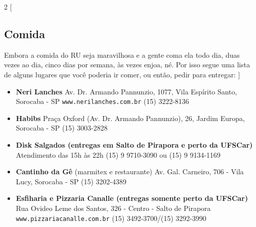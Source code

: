 \begin{multicols}{2}
  [
  \subsection{Comida}
  Embora a comida do RU seja maravilhosa e a gente coma ela todo dia, duas vezes ao dia, cinco dias por semana, às vezes enjoa, né. Por isso segue uma lista de alguns lugares que você poderia ir comer, ou então, pedir para entregar:
  ]

  \begin{itemize}
    \item \textbf{Neri Lanches}
      \newline Av. Dr. Armando Pannunzio, 1077, Vila Espírito Santo, Sorocaba - SP
      \newline \texttt{www.nerilanches.com.br}
      \newline (15) 3222-8136
  \end{itemize}
  \begin{itemize}
    \item \textbf{Habibs}
      \newline Praça Oxford (Av. Dr. Armando Pannunzio), 26, Jardim Europa, Sorocaba - SP
      \newline (15) 3003-2828
  \end{itemize}
  \begin{itemize}
    \item \textbf{Disk Salgados (entregas em Salto de Pirapora e perto da UFSCar)}
      \newline Atendimento das 15h às 22h
      \newline(15) 9 9710-3090 ou (15) 9 9134-1169
  \end{itemize}
  \begin{itemize}
    \item \textbf{Cantinho da Gê} (marmitex e restaurante)
      \newline Av. Gal. Carneiro, 706 - Vila Lucy, Sorocaba - SP
      \newline (15) 3202-4389
  \end{itemize}
  \begin{itemize}
    \item \textbf{Esfiharia e Pizzaria Canalle (entregas somente perto da UFSCar)}
      \newline Rua Ovideo Leme dos Santos, 326 - Centro - Salto de Pirapora
      \newline \texttt{www.pizzariacanalle.com.br}
      \newline (15) 3492-3700/(15) 3292-3990

\end{itemize}
\end{multicols}

